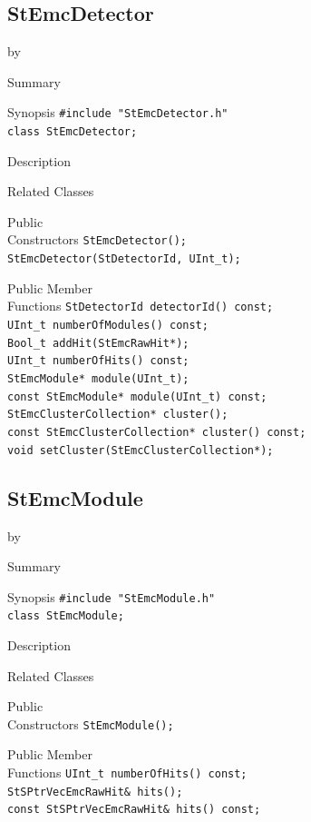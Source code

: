 \documentclass[twoside]{article}
\newcommand{\entrylabel}[1]{\mbox{\textbf{{#1}}}\hfil}%
\newenvironment{entry}
{\begin{list}{}%
    {\renewcommand{\makelabel}{\entrylabel}%
     \setlength{\labelwidth}{90pt}%
     \setlength{\leftmargin}{\labelwidth}
     \advance\leftmargin by \labelsep%
      }%
    }%
  {\end{list}}
\newcommand{\Entrylabel}[1]%
{\raisebox{0pt}[1ex][0pt]{\makebox[\labelwidth][l]%
    {\parbox[t]{\labelwidth}{\hspace{0pt}\textbf{{#1}}}}}}
\newenvironment{Entry}%
{\renewcommand{\entrylabel}{\Entrylabel}\begin{entry}}%
  {\end{entry}}
\begin{document}
\subsection{StEmcDetector}
\label{sec:StEmcDetector}
\begin{Entry}
\item[Summary]
\item[Synopsis]
    \verb+#include "StEmcDetector.h"+\\
    \verb+class StEmcDetector;+\\
\item[Description]
\item[Related Classes]
\item[Public\\ Constructors]
    \verb+StEmcDetector();+\\
    \verb+StEmcDetector(StDetectorId, UInt_t);+\\
\item[Public Member\\ Functions]
    \verb+StDetectorId detectorId() const;+\\
    \verb+UInt_t numberOfModules() const;+\\
    \verb+Bool_t addHit(StEmcRawHit*);+\\
    \verb+UInt_t numberOfHits() const;+\\
    \verb+StEmcModule* module(UInt_t);+\\
    \verb+const StEmcModule* module(UInt_t) const;+\\
    \verb+StEmcClusterCollection* cluster();+\\
    \verb+const StEmcClusterCollection* cluster() const;+\\
    \verb+void setCluster(StEmcClusterCollection*);+\\
\end{Entry}
\clearpage


\subsection{StEmcModule}
\label{sec:StEmcModule}
\begin{Entry}
\item[Summary]
\item[Synopsis]
    \verb+#include "StEmcModule.h"+\\
    \verb+class StEmcModule;+\\
\item[Description]
\item[Related Classes]
\item[Public\\ Constructors]
    \verb+StEmcModule();+\\
\item[Public Member\\ Functions]
    \verb+UInt_t numberOfHits() const;+\\
    \verb+StSPtrVecEmcRawHit& hits();+\\
    \verb+const StSPtrVecEmcRawHit& hits() const;+\\
\end{Entry}
\clearpage
\end{document}
